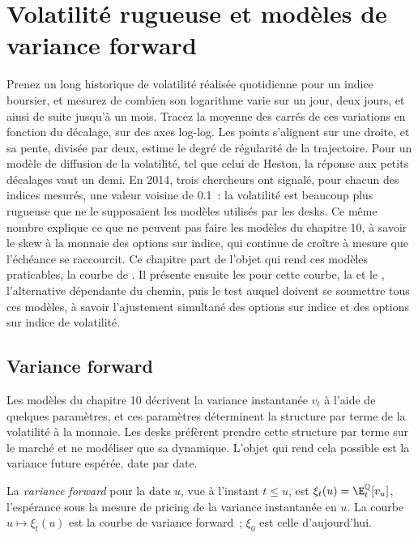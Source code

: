\chapter{Volatilité rugueuse et modèles de variance forward}\label{ch:dv:rough-volatility-and-forward-variance-models}

Prenez un long historique de volatilité réalisée quotidienne pour un indice boursier, et mesurez de combien son logarithme varie
sur un jour, deux jours, et ainsi de suite jusqu'à un mois. Tracez la moyenne des carrés de ces variations en fonction du décalage, sur des axes log-log.
Les points s'alignent sur une droite, et sa pente, divisée par deux, estime le degré de régularité de la trajectoire. Pour un modèle
de diffusion de la volatilité, tel que celui de Heston, la réponse aux petits décalages vaut un demi. En 2014, trois chercheurs
ont signalé, pour chacun des indices mesurés, une valeur voisine de 0.1~: la volatilité est beaucoup plus rugueuse que ne le supposaient les modèles utilisés par les desks.
Ce même nombre explique ce que ne peuvent pas faire les modèles du chapitre 10, à savoir
le skew à la monnaie des options sur indice, qui continue de croître à mesure que l'échéance se raccourcit. Ce chapitre part de l'objet qui rend
ces modèles praticables, la courbe de . Il présente ensuite les  pour cette courbe, la  et le , l'alternative dépendante du chemin, puis le test auquel doivent se soumettre tous ces modèles,
à savoir l'ajustement simultané des options sur indice et des options sur indice de volatilité.

\section{Variance forward}

Les modèles du chapitre 10 décrivent la variance instantanée $v_t$ à l'aide de quelques paramètres, et ces paramètres
déterminent la structure par terme de la volatilité à la monnaie. Les desks préfèrent prendre cette structure par terme sur le
marché et ne modéliser que sa dynamique. L'objet qui rend cela possible est la variance future
espérée, date par date.

\begin{definition}\label{def:dv:rough-volatility-and-forward-variance-models:fwdvar}
La \emph{variance forward} pour la date $u$, vue à l'instant $t\le u$, est
$\xi_t(u)=\E^{\mathbb Q}_t[v_u]$, l'espérance sous la mesure de pricing de la variance instantanée en $u$. La
courbe $u\mapsto\xi_t(u)$ est la courbe de variance forward~; $\xi_0$ est celle d'aujourd'hui.
\end{definition}

